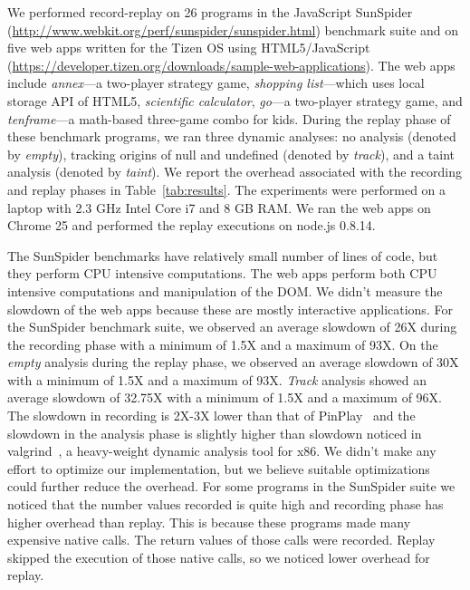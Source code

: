 \documentclass{sig-alternate}
\begin{document}
We performed record-replay on 26 programs in the JavaScript SunSpider
(\url{http://www.webkit.org/perf/sunspider/sunspider.html}) benchmark
suite and on five web apps written for the Tizen OS using
HTML5/JavaScript
(\url{https://developer.tizen.org/downloads/sample-web-applications}).
The web apps include \emph{annex}---a two-player strategy game,
\emph{shopping list}---which uses local storage API of HTML5,
\emph{scientific calculator}, \emph{go}---a two-player strategy game,
and \emph{tenframe}---a math-based three-game combo for kids.  During
the replay phase of these benchmark programs, we ran three dynamic
analyses: no analysis (denoted by \emph{empty}), tracking origins of
null and undefined (denoted by \emph{track}), and a taint analysis
(denoted by \emph{taint}).  We report the overhead associated with the
recording and replay phases in Table~\ref{tab:results}.  The
experiments were performed on a laptop with 2.3 GHz Intel Core i7 and
8 GB RAM.  We ran the web apps on Chrome 25 and performed the replay
executions on node.js 0.8.14.

The SunSpider benchmarks have relatively small number of lines of
code, but they perform CPU intensive computations.  The web apps
perform both CPU intensive computations and manipulation of the DOM.
We didn't measure the slowdown of the web apps because these are
mostly interactive applications.  For the SunSpider benchmark suite,
we observed an average slowdown of 26X during the recording phase with
a minimum of 1.5X and a maximum of 93X.  On the \emph{empty} analysis
during the replay phase, we observed an average slowdown of 30X with a
minimum of 1.5X and a maximum of 93X.  \emph{Track} analysis showed an
average slowdown of 32.75X with a minimum of 1.5X and a maximum of
96X.  The slowdown in recording is 2X-3X lower than that of
PinPlay~\cite{Patil:2010:PFD:1772954.1772958} and the slowdown in the
analysis phase is slightly higher than slowdown noticed in
valgrind~\cite{Nethercote:2007:VFH:1250734.1250746}, a heavy-weight
dynamic analysis tool for x86.  We didn't make any effort to optimize
our implementation, but we believe suitable optimizations could
further reduce the overhead.  For some programs in the SunSpider suite
we noticed that the number values recorded is quite high and recording
phase has higher overhead than replay.  This is because these programs
made many expensive native calls.  The return values of those calls
were recorded.  Replay skipped the execution of those native calls, so
we noticed lower overhead for replay.
\end{document}
